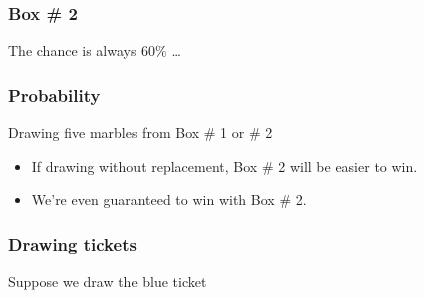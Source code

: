 \documentclass[handout]{beamer}
\begin{document}
   \begin{frame}
   \frametitle{Box \# 2}
   \begin{center}
   \end{center}
   The chance is always 60\% \dots
   \end{frame}


   \begin{frame} \frametitle{Probability}

   \begin{block}
   {Drawing five marbles from Box \# 1 or \# 2}
   \begin{itemize}
     \item If drawing without replacement, Box \# 2 will be easier to win.
     \item We're even guaranteed to win with Box \# 2.
   \end{itemize}
   \end{block}
   \end{frame}



   \begin{frame}
   \frametitle{Drawing tickets}
   \begin{center}
   \end{center}
   Suppose we draw the {\color{blue} blue ticket}
   \end{frame}
\end{document}
